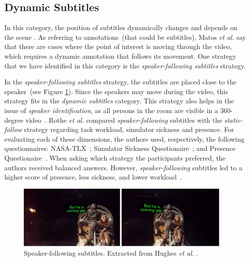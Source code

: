 \subsection{Dynamic Subtitles}
\label{subsection:dynamic_subtitles}

In this category, the position of subtitles dynamically changes and depends on the scene \cite{rothe_dynamic_2018}. As referring to annotations~(that could be subtitles), Matos \emph{et al.} \cite{matos_dynamic_2018} say that there are cases where the point of interest is moving through the video, which requires a dynamic annotation that follows its movement. One strategy that we have identified in this category is the \emph{speaker-following subtitles} strategy.

In the \emph{speaker-following subtitles} strategy, the subtitles are placed close to the speaker~(see Figure \ref{fig:speaker_following}). Since the speakers may move during the video, this strategy fits in the \emph{dynamic subtitles} category. This strategy also helps in the issue of \emph{speaker identification}, as all persons in the room are visible in a 360-degree video~\cite{rothe_dynamic_2018}.  
Rothe \emph{et al.} \cite{rothe_dynamic_2018} compared \emph{speaker-following} subtitles with the \emph{static-follow} strategy regarding task workload, simulator sickness and presence. For evaluating each of these dimensions, the authors used, respectively, the following questionnaires: NASA-TLX~\cite{nasa_hart1988development}; Simulator Sickness Questionaire~\cite{sickness_kennedy1993simulator}; and Presence Questionaire~\cite{presence_witmer1998measuring}. When asking which strategy the participants preferred, the authors received balanced answers. However, \emph{speaker-following} subtitles led to a higher score of presence, less sickness, and lower workload~\cite{rothe_dynamic_2018}.

\begin{figure}[!ht]
    \centering
    \includegraphics[width=0.95\textwidth]{img/video360/speaker-following.png}
    \caption{Speaker-following subtitles. Extracted from Hughes \emph{et al.} \cite{hughes_disruptive_2019}.}
    \label{fig:speaker_following}
\end{figure}

